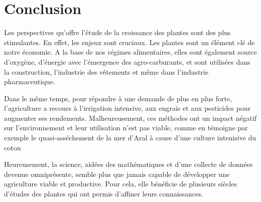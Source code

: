\section*{Conclusion}

Les perspectives qu'offre l'étude de la croissance des plantes sont des plus stimulantes.
En effet, les enjeux sont cruciaux. Les plantes sont un élément clé de notre économie. A la base de nos régimes alimentaires, elles sont également source d'oxygène, d'énergie avec l'émergence des agro-carburants, et sont utilisées dans la construction, l'industrie des vêtements et même dans l'industrie pharmaceutique.



 Dans le même temps, pour répondre à une demande de plus en plus forte, l'agriculture a recours à l'irrigation intensive, aux engrais et aux pesticides pour augmenter ses rendements. Malheureusement, ces méthodes ont un impact négatif sur l'environnement et leur utilisation n'est pas viable, comme en témoigne par exemple le quasi-asséchement de la mer d'Aral à cause d'une culture intenisive du coton~\cite{aral}
 
Heureusement, la science, aidées des mathématiques et d'une collecte de données devenue omniprésente, semble plus que jamais capable de développer une agriculture viable et productive. Pour cela, elle bénéficie de plusieurs siècles d'études des plantes qui ont permis d'affiner leurs connaissances.


